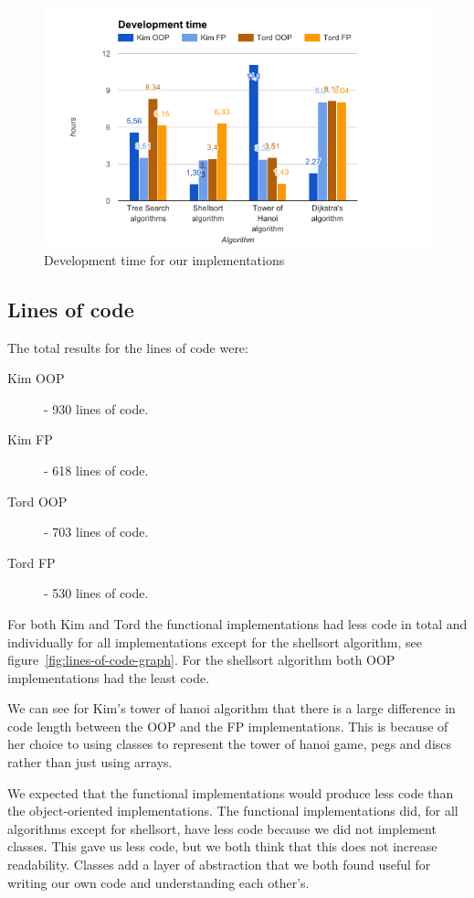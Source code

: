 \documentclass {article}
\begin{document}
\begin{figure}[H]
\includegraphics[width=\textwidth]{development-time-graph}

\caption{Development time for our implementations}
\label{fig:development-time-graph}
\end{figure}
\subsection{Lines of code}
The total results for the lines of code were:
\begin{description}
\item[Kim OOP] - 930 lines of code.
\item[Kim FP] - 618 lines of code.
\item[Tord OOP] - 703 lines of code.
\item[Tord FP] - 530 lines of code.
\end{description}

For both Kim and Tord the functional implementations had less code in total and individually for all implementations except for the shellsort algorithm, see figure~\ref{fig:lines-of-code-graph}. For the shellsort algorithm both OOP implementations had the least code. 

We can see for Kim's tower of hanoi algorithm that there is a large difference in code length between the OOP and the FP implementations. This is because of her choice to using classes to represent the tower of hanoi game, pegs and discs rather than just using arrays.

We expected that the functional implementations would produce less code than the object-oriented implementations. The functional implementations did, for all algorithms except for shellsort, have less code because we did not implement classes. This gave us less code, but we both think that this does not increase readability. Classes add a layer of abstraction that we both found useful for writing our own code and understanding each other's.
\end{document}
